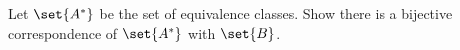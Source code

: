 \documentclass[main.tex]{subfiles}
\begin{document}
\subproblem{}\label{s03p04b}

Let \(\set{A^*}\) be the set of equivalence classes. Show there is a bijective
correspondence of \(\set{A^*}\) with \(\set{B}\).

\todo{}
\end{document}

